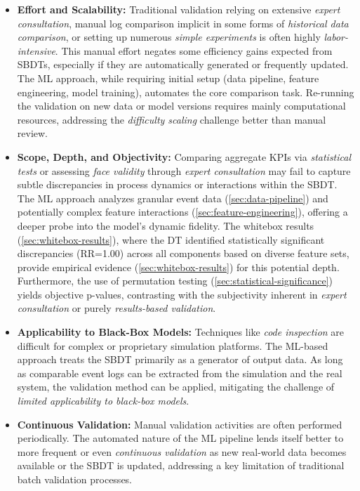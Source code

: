 \begin{itemize}
    \item \textbf{Effort and Scalability:} Traditional validation relying on extensive \textit{expert consultation}, manual log comparison implicit in some forms of \textit{historical data comparison}, or setting up numerous \textit{simple experiments} is often highly \textit{labor-intensive}. This manual effort negates some efficiency gains expected from SBDTs, especially if they are automatically generated or frequently updated. The ML approach, while requiring initial setup (data pipeline, feature engineering, model training), automates the core comparison task. Re-running the validation on new data or model versions requires mainly computational resources, addressing the \textit{difficulty scaling} challenge better than manual review.

    \item \textbf{Scope, Depth, and Objectivity:} Comparing aggregate KPIs via \textit{statistical tests} or assessing \textit{face validity} through \textit{expert consultation} may fail to capture subtle discrepancies in process dynamics or interactions within the SBDT. The ML approach analyzes granular event data (\autoref{sec:data-pipeline}) and potentially complex feature interactions (\autoref{sec:feature-engineering}), offering a deeper probe into the model's dynamic fidelity. The whitebox results (\autoref{sec:whitebox-results}), where the DT identified statistically significant discrepancies (RR=1.00) across all components based on diverse feature sets, provide empirical evidence (\autoref{sec:whitebox-results}) for this potential depth. Furthermore, the use of permutation testing (\autoref{sec:statistical-significance}) yields objective p-values, contrasting with the subjectivity inherent in \textit{expert consultation} or purely \textit{results-based validation}.

    \item \textbf{Applicability to Black-Box Models:} Techniques like \textit{code inspection} are difficult for complex or proprietary simulation platforms. The ML-based approach treats the SBDT primarily as a generator of output data. As long as comparable event logs can be extracted from the simulation and the real system, the validation method can be applied, mitigating the challenge of \textit{limited applicability to black-box models}.

    \item \textbf{Continuous Validation:} Manual validation activities are often performed periodically. The automated nature of the ML pipeline lends itself better to more frequent or even \textit{continuous validation} as new real-world data becomes available or the SBDT is updated, addressing a key limitation of traditional batch validation processes.


\end{itemize}

